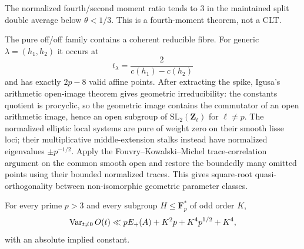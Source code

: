 The normalized fourth/second moment ratio tends to $3$ in the maintained split
double average below $\theta<1/3$.  This is a fourth-moment theorem, not a CLT.

The pure off/off family contains a coherent reducible fibre.  For generic
$\lambda=(h_1,h_2)$ it occurs at
\[
t_\lambda=\frac{2}{c(h_1)-c(h_2)}
\]
and has exactly $2p-8$ valid affine points.  After extracting the spike,
Igusa's arithmetic open-image theorem \cite{BLV2009} gives geometric
irreducibility: the constants quotient is procyclic, so the geometric image
contains the commutator of an open arithmetic image, hence an open subgroup
of $\mathrm{SL}_2(\mathbf Z_\ell)$ for $\ell\ne p$.
The normalized elliptic local systems are pure of weight zero on their smooth
lisse loci; their multiplicative middle-extension stalks instead have
normalized eigenvalues $\pm p^{-1/2}$.
Apply the Fouvry--Kowalski--Michel trace-correlation argument \cite{FKM2013}
on the common smooth open and restore the boundedly many omitted points using
their bounded normalized traces.  This gives square-root quasi-orthogonality
between non-isomorphic geometric parameter classes.

\begin{theorem}\label{thm:offoff}
For every prime $p>3$ and every subgroup $H\le\mathbf F_p^\ast$ of
odd order $K$,
\begin{equation}\label{eq:offoff}
\operatorname{Var}_{t\ne0}O(t)
\ll pE_+(A)+K^2p+K^4p^{1/2}+K^4,
\end{equation}
with an absolute implied constant.
\end{theorem}


